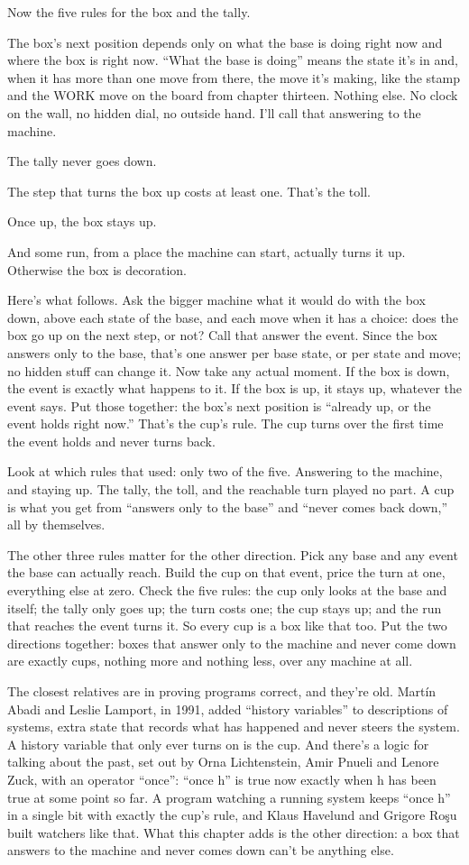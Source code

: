\documentclass[11pt,twoside]{article}
\theoremstyle{thielethm}
\theoremstyle{thieledef}
\theoremstyle{thieledef}
\theoremstyle{thieledef}
\theoremstyle{thielethm}
\theoremstyle{thieleobs}
\theoremstyle{thielethm}
\begin{document}
Now the five rules for the box and the tally.

The box's next position depends only on what the base is doing right now and where the box is right now. ``What the base is doing'' means the state it's in and, when it has more than one move from there, the move it's making, like the stamp and the WORK move on the board from chapter thirteen. Nothing else. No clock on the wall, no hidden dial, no outside hand. I'll call that answering to the machine.

The tally never goes down.

The step that turns the box up costs at least one. That's the toll.

Once up, the box stays up.

And some run, from a place the machine can start, actually turns it up. Otherwise the box is decoration.

Here's what follows. Ask the bigger machine what it would do with the box down, above each state of the base, and each move when it has a choice: does the box go up on the next step, or not? Call that answer the event. Since the box answers only to the base, that's one answer per base state, or per state and move; no hidden stuff can change it. Now take any actual moment. If the box is down, the event is exactly what happens to it. If the box is up, it stays up, whatever the event says. Put those together: the box's next position is ``already up, or the event holds right now.'' That's the cup's rule. The cup turns over the first time the event holds and never turns back.

Look at which rules that used: only two of the five. Answering to the machine, and staying up. The tally, the toll, and the reachable turn played no part. A cup is what you get from ``answers only to the base'' and ``never comes back down,'' all by themselves.

The other three rules matter for the other direction. Pick any base and any event the base can actually reach. Build the cup on that event, price the turn at one, everything else at zero. Check the five rules: the cup only looks at the base and itself; the tally only goes up; the turn costs one; the cup stays up; and the run that reaches the event turns it. So every cup is a box like that too. Put the two directions together: boxes that answer only to the machine and never come down are exactly cups, nothing more and nothing less, over any machine at all.

The closest relatives are in proving programs correct, and they're old. Martín Abadi and Leslie Lamport, in 1991, added ``history variables'' to descriptions of systems, extra state that records what has happened and never steers the system. A history variable that only ever turns on is the cup. And there's a logic for talking about the past, set out by Orna Lichtenstein, Amir Pnueli and Lenore Zuck, with an operator ``once'': ``once h'' is true now exactly when h has been true at some point so far. A program watching a running system keeps ``once h'' in a single bit with exactly the cup's rule, and Klaus Havelund and Grigore Roşu built watchers like that. What this chapter adds is the other direction: a box that answers to the machine and never comes down can't be anything else.
\end{document}
